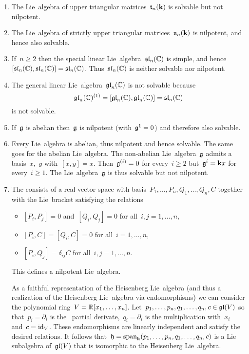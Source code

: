 \begin{examples}
  \label{examples for solvable and nilpotent}
  \leavevmode
  \begin{enumerate}
    \item
      The Lie~algebra of upper triangular matrices~$\mathfrak{t}_n(\mathbf{k})$ is solvable but not nilpotent.
    \item
      The Lie~algebra of strictly upper triangular matrices~$\mathfrak{n}_n(\mathbf{k})$ is nilpotent, and hence also solvable.
    \item
      If~$n \geq 2$ then the special linear Lie~algebra~$\mathfrak{sl}_n(\mathbb{C})$ is simple, and hence~$[\mathfrak{sl}_n(\mathbb{C}), \mathfrak{sl}_n(\mathbb{C})] = \mathfrak{sl}_n(\mathbb{C})$.
      Thus~$\mathfrak{sl}_n(\mathbb{C})$ is neither solvable nor nilpotent.
    \item
      The general linear Lie~algebra~$\mathfrak{gl}_n(\mathbb{C})$ is not solvable because
      \[
        \mathfrak{gl}_n(\mathbb{C})^{(1)}
        =
        [\mathfrak{gl}_n(\mathbb{C}), \mathfrak{gl}_n(\mathbb{C})]
        =
        \mathfrak{sl}_n(\mathbb{C})
      \]
      is not solvable.
    \item
      If~$\mathfrak{g}$ is abelian then~$\mathfrak{g}$ is nilpotent (with~$\mathfrak{g}^1 = 0$) and therefore also solvable.
    \item
      Every {\onedimensional} Lie~algebra is abelian, thus nilpotent and hence solvable.
      The same goes for the {\twodimensional} abelian Lie~algebra.
      The {\twodimensional} non-abelian Lie~algebra~$\mathfrak{g}$ admits a basis~$x$,~$y$ with~$[x,y] = x$.
      Then~$\mathfrak{g}^{(i)} = 0$ for every~$i \geq 2$ but~$\mathfrak{g}^i = \mathbf{k} x$ for every~$i \geq 1$.
      The Lie~algebra~$\mathfrak{g}$ is thus solvable but not nilpotent.
    \item
      The  consists of a real vector space with basis~$P_1, \dotsc, P_n, Q_1, \dotsc, Q_n, C$ together with the Lie~bracket satisfying the relations
      \begin{itemize}
        \item
          $[P_i, P_j] = 0$ and~$[Q_i, Q_j] = 0$ for all~$i, j = 1, \dotsc, n$,
        \item
          $[P_i, C] = [Q_i, C] = 0$ for all~$i = 1, \dotsc, n$,
        \item
          $[P_i, Q_j] = \delta_{ij} C$ for all~$i,j = 1, \dotsc, n$.
      \end{itemize}
      This defines a nilpotent Lie~algebra.
      
      As a faithful representation of the Heisenberg Lie~algebra (and thus a realization of the Heisenberg Lie~algebra via endomorphisms) we can consider the polynomial ring~$V = \mathbb{R}[x_1, \dotsc, x_n]$.
      Let~$p_1, \dotsc, p_n, q_1, \dotsc, q_n, c \in \mathfrak{gl}(V)$ so that~$p_i = \partial_i$ is the~{} partial derivate,~$q_i = \partial_i$ is the multiplication with~$x_i$ and~$c = \operatorname{id}_V$.
      These endomorphisms are linearly independent and satisfy the desired relations.
      It follows that~$\mathfrak{h} = \operatorname{span}_{\mathbf{k}}(p_1, \dotsc, p_n, q_1, \dotsc, q_n, c)$ is a Lie subalgebra of~$\mathfrak{gl}(V)$ that is isomorphic to the Heisenberg Lie~algebra.
  \end{enumerate}
\end{examples}



